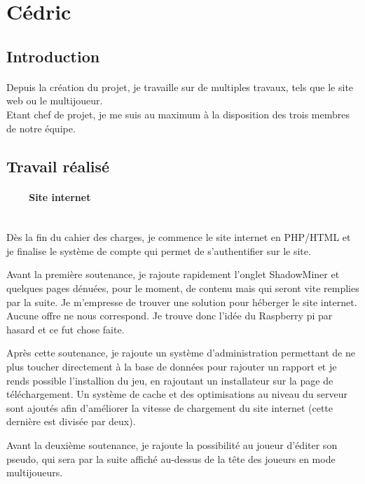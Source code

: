 \documentclass[titlepage, 13px, a4paper]{report}
\begin{document}
\newpage
\section{Cédric}
\subsection{Introduction}
\paragraph{} \hspace{0pt}
Depuis la création du projet, je travaille sur de multiples travaux, tels que le site web ou le multijoueur. \\
Etant chef de projet, je me suis au maximum à la disposition des trois membres de notre équipe. \\


\subsection{Travail réalisé}
\paragraph{~~~~Site internet} \hspace{0pt} \\
Dès la fin du cahier des charges, je commence le site internet en PHP/HTML et je finalise le système de 
compte qui permet de s’authentifier sur le site.

Avant la première soutenance, je rajoute rapidement l’onglet ShadowMiner et quelques pages dénuées, pour 
le moment, de contenu mais qui seront vite remplies par la suite. Je m’empresse de trouver une solution pour héberger le 
site internet. Aucune offre ne nous correspond. Je trouve donc l’idée du Raspberry pi par hasard et ce fut chose faite.

Après cette soutenance, je rajoute un système d’administration permettant de ne plus toucher directement 
à la base de données pour rajouter un rapport et je rends possible l’installion du jeu, en rajoutant un 
installateur sur la page de téléchargement. Un système de cache et des optimisations au niveau du serveur 
sont ajoutés afin d’améliorer la vitesse de chargement du site internet (cette dernière est divisée par deux).

Avant la deuxième soutenance, je rajoute la possibilité au joueur d’éditer son pseudo, qui sera par la suite affiché 
au-dessus de la tête des joueurs en mode multijoueurs. \\
\end{document}
